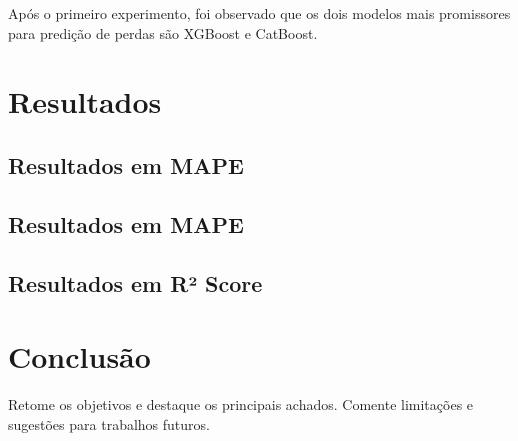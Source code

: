 \documentclass{article}
\begin{document}
Após o primeiro experimento, foi observado que os dois modelos mais promissores para predição de perdas são XGBoost e CatBoost.

\section{Resultados}

\subsection{Resultados em MAPE}
\subsection{Resultados em MAPE}
\subsection{Resultados em R² Score}


\section{Conclusão}
Retome os objetivos e destaque os principais achados. Comente limitações e sugestões para trabalhos futuros.

\newpage
\end{document}
